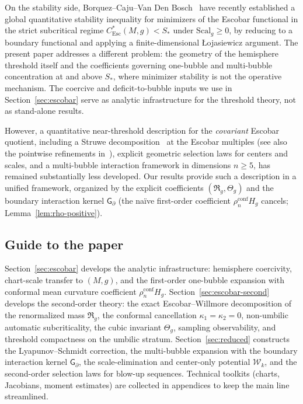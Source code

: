\documentclass[11pt,reqno,a4paper]{amsart}
\numberwithin{equation}{section}
\theoremstyle{plain}
\newcommand{\Scal}{\mathrm{Scal}}
\theoremstyle{remark}
\theoremstyle{plain}
\begin{document}
On the stability side, Borquez--Caju--Van Den Bosch~\cite{BorquezCajuVDB2025} have recently established
a global quantitative stability inequality for minimizers of the Escobar functional in the strict
subcritical regime $C^*_{\mathrm{Esc}}(M,g)<S_\ast$ under $\Scal_g\ge0$,
by reducing to a boundary functional and applying a finite-dimensional {\L}ojasiewicz argument.
The present paper addresses a different problem: the geometry of the hemisphere threshold itself
and the coefficients governing one-bubble and multi-bubble concentration at
and above $S_\ast$, where minimizer stability is not the operative mechanism.
The coercive and deficit-to-bubble inputs we use in Section~\ref{sec:escobar} serve as analytic
infrastructure for the threshold theory, not as stand-alone results.

However, a quantitative near-threshold description for the \emph{covariant} Escobar quotient, including a Struwe decomposition~\cite{Struwe1984} at the Escobar multiples (see also the pointwise refinements in~\cite{DruetHebeyRobert2004}), explicit geometric selection laws for centers and scales, and a multi-bubble interaction framework in dimensions $n \ge 5$, has remained substantially less developed. Our results provide such a description in a unified framework, organized by the explicit coefficients $(\mathfrak{R}_g, \Theta_g)$ and the boundary interaction kernel $\mathsf{G}_\partial$ (the na\"ive first-order coefficient $\rho_n^{\mathrm{conf}}H_g$ cancels; Lemma~\ref{lem:rho-positive}).


\subsection{Guide to the paper}
Section~\ref{sec:escobar} develops the analytic infrastructure: hemisphere coercivity,
chart-scale transfer to $(M,g)$, and the first-order one-bubble expansion with
conformal mean curvature coefficient $\rho_n^{\mathrm{conf}}H_g$.
Section~\ref{sec:escobar-second} develops the second-order theory: the exact
Escobar--Willmore decomposition of the renormalized mass $\mathfrak R_g$,
the conformal cancellation $\kappa_1=\kappa_2=0$, non-umbilic automatic subcriticality,
the cubic invariant $\Theta_g$, sampling observability, and threshold compactness on the umbilic stratum.
Section~\ref{sec:reduced} constructs the Lyapunov--Schmidt correction,
the multi-bubble expansion with the boundary interaction kernel $\mathsf G_\partial$,
the scale-elimination and center-only potential $\mathcal W_k$,
and the second-order selection laws for blow-up sequences.
Technical toolkits (charts, Jacobians, moment estimates)
are collected in appendices to keep the main line streamlined.
\end{document}
